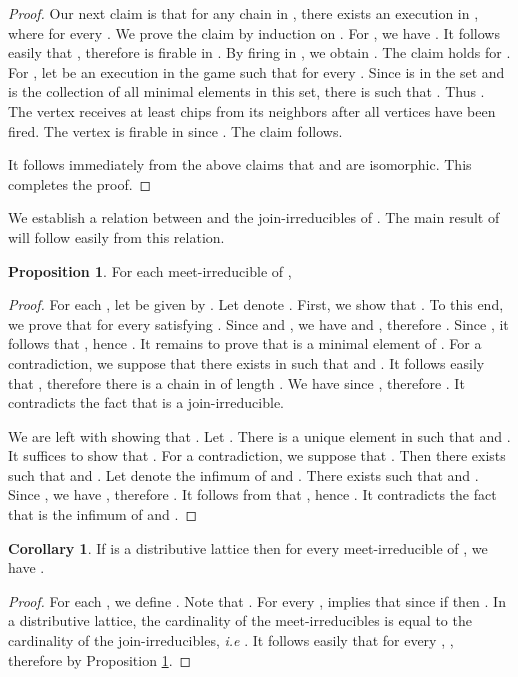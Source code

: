 \documentclass{article}
\theoremstyle{definition}
\newtheorem{coro}{Corollary}
\newtheorem{prop}{Proposition}
\begin{document}
\begin{proof}
Our next claim is that for any chain  in , there exists an execution  in , where  for every . We prove the claim by induction on . For , we have . It follows easily that , therefore  is firable in . By firing  in , we obtain . The claim holds for . For , let  be an execution in the game such that  for every .
Since  is in the set  and  is the collection of all minimal elements in this set,  there is  such that . Thus . The vertex  receives at least  chips from its neighbors after all vertices  have been fired. The vertex  is firable in  since . The claim follows.

It follows immediately from the above claims that  and  are isomorphic. This completes the proof.
\end{proof}
We establish a relation between  and the join-irreducibles of . The main result of \cite{MVP01} will follow easily from this relation.
\begin{prop}
\label{relation with join-irreducibles}
For each meet-irreducible  of , 
\end{prop}
\begin{proof}
For each , let  be given by .  Let  denote . First, we show that . To this end, we prove that  for every  satisfying .  Since  and , we have  and , therefore . Since , it follows that , hence . It remains to prove that   is a minimal element of . For a contradiction, we suppose that there exists  in  such that  and . It follows easily that , therefore there is a chain  in  of length . We have  since , therefore . It contradicts the fact that  is a join-irreducible. 

We are left with showing that . Let . There is a unique element  in  such that  and . It suffices to show that . For a contradiction, we suppose that . Then there exists  such that  and . Let  denote the infimum of  and . There exists  such that  and . Since , we have , therefore . It follows from  that , hence . It contradicts the fact that  is the infimum of  and .
\end{proof}
\begin{coro}
\label{uniqueness of join-irreducibles}
If  is a distributive lattice then for every meet-irreducible  of , we have . 
\end{coro}
\begin{proof}
For each , we define . Note that . For every ,  implies that   since if  then . In a distributive lattice, the cardinality of the meet-irreducibles is equal to the cardinality of the join-irreducibles, \emph{i.e} . It follows easily that for every , , therefore  by Proposition \ref{relation with join-irreducibles}.
\end{proof}
\end{document}
